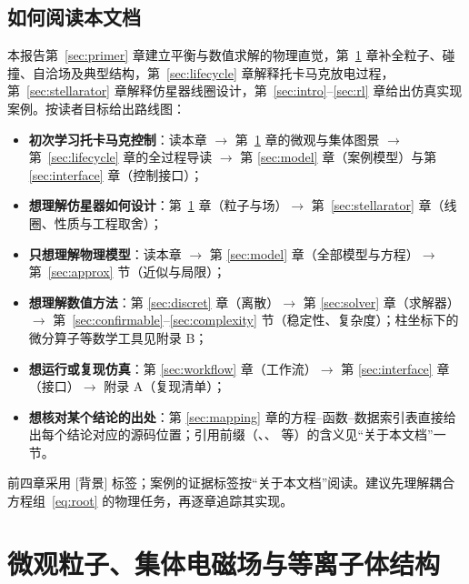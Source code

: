 \documentclass[12pt,fontset=none]{ctexart}
\numberwithin{equation}{section}
\numberwithin{table}{section}
\numberwithin{figure}{section}
\newcommand{\code}[1]{\texttt{\expandafter\seqsplit\expandafter{\detokenize{#1}}}}
\begin{document}
\subsection{如何阅读本文档}\label{sec:primer-route}

本报告第~\ref{sec:primer} 章建立平衡与数值求解的物理直觉，第~\ref{sec:microphysics} 章补全粒子、碰撞、自洽场及典型结构，第~\ref{sec:lifecycle} 章解释托卡马克放电过程，第~\ref{sec:stellarator} 章解释仿星器线圈设计，第~\ref{sec:intro}--\ref{sec:rl} 章给出仿真实现案例。按读者目标给出路线图：

\begin{itemize}[nosep]\small
  \item \textbf{初次学习托卡马克控制}：读本章 $\to$ 第~\ref{sec:microphysics} 章的微观与集体图景 $\to$ 第~\ref{sec:lifecycle} 章的全过程导读 $\to$ 第 \ref{sec:model} 章（案例模型）与第 \ref{sec:interface} 章（控制接口）；
  \item \textbf{想理解仿星器如何设计}：第~\ref{sec:microphysics} 章（粒子与场）$\to$ 第~\ref{sec:stellarator} 章（线圈、性质与工程取舍）；
  \item \textbf{只想理解物理模型}：读本章 $\to$ 第 \ref{sec:model} 章（全部模型与方程）$\to$ 第~\ref{sec:approx} 节（近似与局限）；
  \item \textbf{想理解数值方法}：第 \ref{sec:discret} 章（离散）$\to$ 第 \ref{sec:solver} 章（求解器）$\to$ 第~\ref{sec:confirmable}--\ref{sec:complexity} 节（稳定性、复杂度）；柱坐标下的微分算子等数学工具见附录 B；
  \item \textbf{想运行或复现仿真}：第 \ref{sec:workflow} 章（工作流）$\to$ 第 \ref{sec:interface} 章（接口）$\to$ 附录 A（复现清单）；
  \item \textbf{想核对某个结论的出处}：第 \ref{sec:mapping} 章的方程--函数--数据索引表直接给出每个结论对应的源码位置；引用前缀（\code{G:}、\code{V/}、\code{D/} 等）的含义见``关于本文档''一节。
\end{itemize}

前四章采用 [背景] 标签；案例的证据标签按``关于本文档''阅读。建议先理解耦合方程组~\eqref{eq:root} 的物理任务，再逐章追踪其实现。

\clearpage

\clearpage
\section{微观粒子、集体电磁场与等离子体结构}\label{sec:microphysics}
\end{document}
